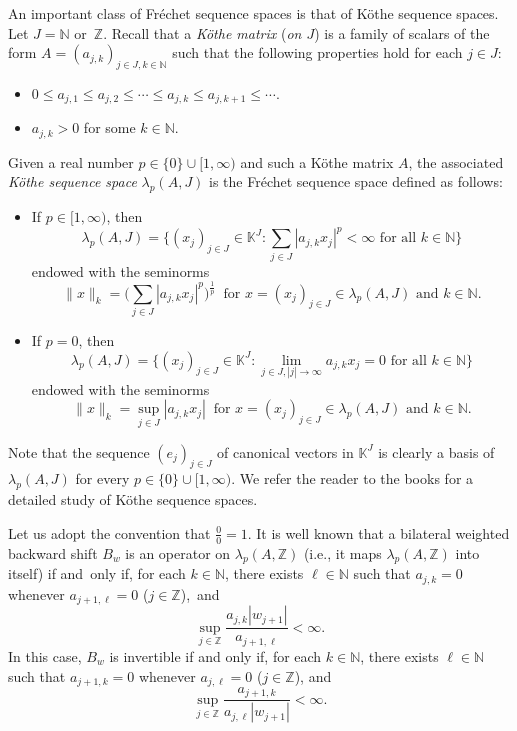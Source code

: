 \documentclass[12pt]{amsart}
\theoremstyle{theorem}
\theoremstyle{definition}
\theoremstyle{remark} \theoremstyle{question} \theoremstyle{example}
\newcommand{\N}{\mathbb{N}}   %
\newcommand{\Z}{\mathbb{Z}}   %
\newcommand{\K}{\mathbb{K}}   %
\begin{document}
An important class of Fr\'echet sequence spaces is that of K\"othe sequence spaces. Let $J = \N$ or~$\Z$. 
Recall that a {\em K\"othe matrix} ({\em on $J$}) is a family of scalars of the form 
$A = (a_{j,k})_{j \in J,k \in \N}$ such that the following properties hold for each $j \in J$:
\begin{itemize}
\item $0 \leq a_{j,1} \leq a_{j,2} \leq \cdots \leq a_{j,k} \leq a_{j,k+1} \leq \cdots$.
\item $a_{j,k} > 0$ for some $k \in \N$. 
\end{itemize}
Given a real number $p \in \{0\} \cup [1,\infty)$ and such a K\"othe matrix $A$, 
the associated {\em K\"othe sequence space} $\lambda_p(A,J)$ is the Fr\'echet sequence space defined as follows:
\begin{itemize}
\item If $p \in [1,\infty)$, then 
    \[
    \lambda_p(A,J) = \Big\{(x_j)_{j \in J} \in \K^J : \sum_{j \in J} |a_{j,k} x_j|^p < \infty \text{ for all } k \in \N\Big\}
    \] 
    endowed with the seminorms
    \[
    \|x\|_k = \Big(\sum_{j \in J} |a_{j,k} x_j|^p\Big)^\frac{1}{p} \ \text{ for } x = (x_j)_{j \in J} \in \lambda_p(A,J) \text{ and } k \in \N.
    \]
\item If $p = 0$, then 
    \[
    \lambda_p(A,J) = \Big\{(x_j)_{j \in J} \in \K^J : \lim_{j \in J, |j| \to \infty} a_{j,k} x_j = 0 \text{ for all } k \in \N\Big\}
    \]
    endowed with the seminorms
    \[
    \|x\|_k = \sup_{j \in J} |a_{j,k} x_j| \ \text{ for } x = (x_j)_{j \in J} \in \lambda_p(A,J) \text{ and } k \in \N.
    \]
\end{itemize}
Note that the sequence $(e_j)_{j \in J}$ of canonical vectors in $\K^J$ is clearly a basis of $\lambda_p(A,J)$ 
for every $p \in \{0\} \cup [1,\infty)$.
We refer the reader to the books \cite{HJar81,GKot69,RMeiDVog97} for a detailed study of K\"othe sequence spaces.

Let us adopt the convention that $\frac{0}{0} = 1$. It is well known that a bilateral weighted backward shift $B_w$ is an operator 
on $\lambda_p(A,\Z)$ (i.e., it maps $\lambda_p(A,\Z)$ into itself) if and~only if, for each $k \in \N$, 
there exists $\ell \in \N$ such that $a_{j,k} = 0$ whenever $a_{j+1,\ell} = 0$ ($j \in \Z$),~and  
\begin{equation}\label{Bw-Defined}
\sup_{j \in \Z} \frac{a_{j,k} |w_{j+1}|}{a_{j+1,\ell}} < \infty.
\end{equation}
In this case, $B_w$ is invertible if and only if, for each $k \in \N$, there exists $\ell \in \N$ such that 
$a_{j+1,k} = 0$ whenever $a_{j,\ell} = 0$ ($j \in \Z$), and  
\begin{equation}\label{Bw-Invertible}
\sup_{j \in \Z} \frac{a_{j+1,k}}{a_{j,\ell} |w_{j+1}|} < \infty.
\end{equation}
\end{document}
